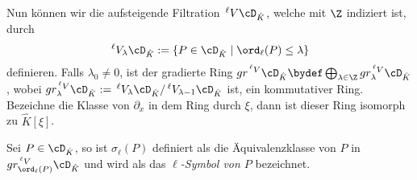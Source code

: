 Nun können wir die aufsteigende Filtration $\,^\ell V\cD_{\hat K}$, welche mit
$\Z$ indiziert ist, durch
\[
\,^\ell V_\lambda\cD_{\hat K}:=\{P\in\cD_{\hat K}\mid \ord_\ell(P)\leq \lambda\}
\]
definieren.
Falls $\lambda_0\neq 0$, ist der gradierte Ring $gr^{\,^\ell V}\cD_{\hat
K}\bydef \bigoplus_{\lambda \in \Z}gr_\lambda^{\,^\ell V}\cD_{\hat K}$, wobei
$gr_\lambda^{\,^\ell V}\cD_{\hat K}:=\,^\ell V_\lambda\cD_{\hat K}/\,^\ell
V_{\lambda-1}\cD_{\hat K}$ ist, ein kommutativer Ring. Bezeichne die Klasse von
$\partial_x$ in dem Ring durch $\xi$, dann ist dieser Ring isomorph zu $\hat
K[\xi]$.
\begin{defn}
Sei $P\in \cD_{\hat K}$, so ist $\sigma_\ell(P)$ definiert als die
Äquivalenzklasse von $P$ in $gr_{\ord_\ell(P)}^{\,^\ell V}\cD_{\hat K}$ und
wird als das \emph{$\ell$-Symbol von $P$} bezeichnet.
\end{defn}
